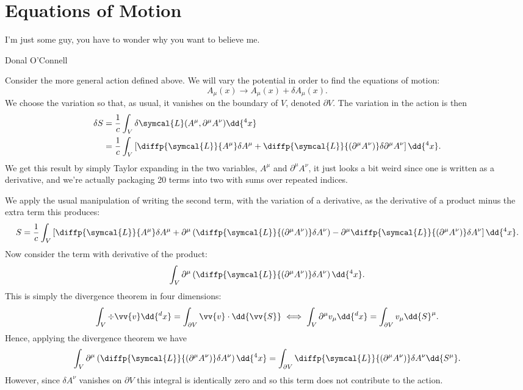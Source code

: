 \documentclass[fleqn]{NotesClass}
\newcommand*{\lagrangianDensity}{\symcal{L}}
\begin{document}
    \section{Equations of Motion}
    \epigraph{I'm just some guy, you have to wonder why you want to believe me.}{Donal O'Connell}
    Consider the more general action defined above.
    We will vary the potential in order to find the equations of motion:
    \begin{equation}
        A_\mu(x) \to A_\mu(x) + \delta A_\mu(x).
    \end{equation}
    We choose the variation so that, as usual, it vanishes on the boundary of \(V\), denoted \(\partial V\).
    The variation in the action is then
    \begin{align}
        \delta S &= \frac{1}{c} \int_V \delta \lagrangianDensity(A^\mu, \partial^\mu A^\nu) \dd{^4x}\\
        &= \frac{1}{c} \int_V \left[ \diffp{\lagrangianDensity}{A^\mu} \delta A^\mu + \diffp{\lagrangianDensity}{(\partial^\mu A^\nu)} \delta \partial^\mu A^\nu \right] \dd{^4x}.
    \end{align}
    We get this result by simply Taylor expanding in the two variables, \(A^\mu\) and \(\partial^\mu A^\nu\), it just looks a bit weird since one is written as a derivative, and we're actually packaging 20 terms into two with sums over repeated indices.
    
    We apply the usual manipulation of writing the second term, with the variation of a derivative, as the derivative of a product minus the extra term this produces:
    \begin{equation}
        S = \frac{1}{c} \int_V \left[ \diffp{\lagrangianDensity}{A^\mu} \delta A^\mu + \partial^\mu\left( \diffp{\lagrangianDensity}{(\partial^\mu A^\nu)} \delta A^\nu \right) - \partial^\mu\diffp{\lagrangianDensity}{(\partial^\mu A^\nu)} \delta A^\nu \right] \dd{^4x}.
    \end{equation}
    Now consider the term with derivative of the product:
    \begin{equation}
        \int_V \partial^\mu \left( \diffp{\lagrangianDensity}{(\partial^\mu A^\nu)} \delta A^\nu \right) \dd{^4x}.
    \end{equation}
    This is simply the divergence theorem in four dimensions:
    \begin{equation}
        \int_V \div \vv{v} \dd{^d x} = \int_{\partial V} \vv{v} \cdot \dd{\vv{S}} \iff \int_V \partial^\mu v_\mu \dd{^dx} = \int_{\partial V} v_\mu \dd{S}^\mu.
    \end{equation}
    Hence, applying the divergence theorem we have
    \begin{equation}
        \int_V \partial^\mu\left( \diffp{\lagrangianDensity}{(\partial^\mu A^\nu)} \delta A^\nu \right) \dd{^4x} = \int_{\partial V} \diffp{\lagrangianDensity}{(\partial^\mu A^\nu)} \delta A^\nu \dd{S^\mu}.
    \end{equation}
    However, since \(\delta A^\nu\) vanishes on \(\partial V\) this integral is identically zero and so this term does not contribute to the action.
    
\end{document}
